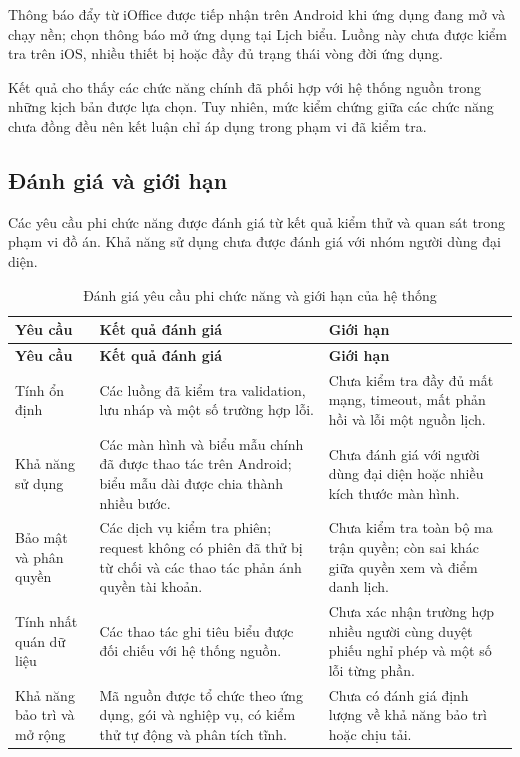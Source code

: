 Thông báo đẩy từ iOffice được tiếp nhận trên Android khi ứng dụng đang mở và chạy nền; chọn thông báo mở ứng dụng tại Lịch biểu. Luồng này chưa được kiểm tra trên iOS, nhiều thiết bị hoặc đầy đủ trạng thái vòng đời ứng dụng.

Kết quả cho thấy các chức năng chính đã phối hợp với hệ thống nguồn trong những kịch bản được lựa chọn. Tuy nhiên, mức kiểm chứng giữa các chức năng chưa đồng đều nên kết luận chỉ áp dụng trong phạm vi đã kiểm tra.

\subsection{Đánh giá và giới hạn}

Các yêu cầu phi chức năng được đánh giá từ kết quả kiểm thử và quan sát trong phạm vi đồ án. Khả năng sử dụng chưa được đánh giá với nhóm người dùng đại diện.

\begin{xltabular}{\textwidth}{|L{2.4cm}|Y|Y|}
\caption{Đánh giá yêu cầu phi chức năng và giới hạn của hệ thống}\label{tab:ch6_nfr_evaluation} \\
\hline
\textbf{Yêu cầu} & \textbf{Kết quả đánh giá} & \textbf{Giới hạn} \\
\hline
\endfirsthead
\hline
\textbf{Yêu cầu} & \textbf{Kết quả đánh giá} & \textbf{Giới hạn} \\
\hline
\endhead
Tính ổn định & Các luồng đã kiểm tra validation, lưu nháp và một số trường hợp lỗi. & Chưa kiểm tra đầy đủ mất mạng, timeout, mất phản hồi và lỗi một nguồn lịch. \\
\hline
Khả năng sử dụng & Các màn hình và biểu mẫu chính đã được thao tác trên Android; biểu mẫu dài được chia thành nhiều bước. & Chưa đánh giá với người dùng đại diện hoặc nhiều kích thước màn hình. \\
\hline
Bảo mật và phân quyền & Các dịch vụ kiểm tra phiên; request không có phiên đã thử bị từ chối và các thao tác phản ánh quyền tài khoản. & Chưa kiểm tra toàn bộ ma trận quyền; còn sai khác giữa quyền xem và điểm danh lịch. \\
\hline
Tính nhất quán dữ liệu & Các thao tác ghi tiêu biểu được đối chiếu với hệ thống nguồn. & Chưa xác nhận trường hợp nhiều người cùng duyệt phiếu nghỉ phép và một số lỗi từng phần. \\
\hline
Khả năng bảo trì và mở rộng & Mã nguồn được tổ chức theo ứng dụng, gói và nghiệp vụ, có kiểm thử tự động và phân tích tĩnh. & Chưa có đánh giá định lượng về khả năng bảo trì hoặc chịu tải. \\
\hline
\end{xltabular}

